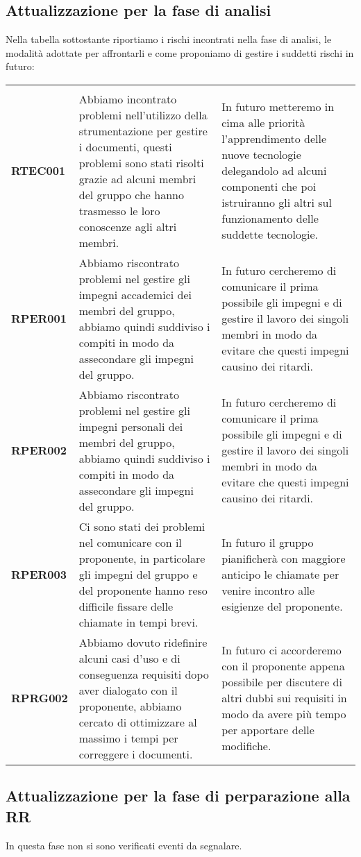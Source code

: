 \documentclass[../piano-di-progetto]{subfiles}
\begin{document}
\subsection{Attualizzazione per la fase di analisi}%
\label{sub:attualizzazione_fase_analisi}
Nella tabella sottostante riportiamo i rischi incontrati nella fase di analisi, le modalità adottate per affrontarli e come proponiamo di gestire i suddetti rischi in futuro:
\begin{table}[H]%
  \label{tab:registro_delle_modifiche}

  \centering

  \begin{longtable}[H]{|p{10em}|p{17em}|p{17em}|}
    \rowcolor{darkgray!90!}\color{white}{\textbf{Rischio}} & \color{white}{\textbf{Gestione}} & \color{white}{\textbf{Monitoraggio}} \\
    \textbf{RTEC001} & Abbiamo incontrato problemi nell'utilizzo della strumentazione per gestire i documenti, questi problemi sono stati risolti grazie ad alcuni membri del gruppo che hanno trasmesso le loro conoscenze agli altri membri. & In futuro metteremo in cima alle priorità l'apprendimento delle nuove tecnologie delegandolo ad alcuni componenti che poi istruiranno gli altri sul funzionamento delle suddette tecnologie.\\
    \textbf{RPER001} & Abbiamo riscontrato problemi nel gestire gli impegni accademici dei membri del gruppo, abbiamo quindi suddiviso i compiti in modo da assecondare gli impegni del gruppo. & In futuro cercheremo di comunicare il prima possibile gli impegni e di gestire il lavoro dei singoli membri in modo da evitare che questi impegni causino dei ritardi.\\
    \textbf{RPER002} & Abbiamo riscontrato problemi nel gestire gli impegni personali dei membri del gruppo, abbiamo quindi suddiviso i compiti in modo da assecondare gli impegni del gruppo. & In futuro cercheremo di comunicare il prima possibile gli impegni e di gestire il lavoro dei singoli membri in modo da evitare che questi impegni causino dei ritardi.\\
    \textbf{RPER003} & Ci sono stati dei problemi nel comunicare con il proponente, in particolare gli impegni del gruppo e del proponente hanno reso difficile fissare delle chiamate in tempi brevi. & In futuro il gruppo pianificherà con maggiore anticipo le chiamate per venire incontro alle esigienze del proponente.\\
    \textbf{RPRG002} & Abbiamo dovuto ridefinire alcuni casi d'uso e di conseguenza requisiti dopo aver dialogato con il proponente, abbiamo cercato di ottimizzare al massimo i tempi per correggere i documenti. & In futuro ci accorderemo con il proponente appena possibile per discutere di altri dubbi sui requisiti in modo da avere più tempo per apportare delle modifiche.\\
    \hline
  \end{longtable}
\end{table}
\subsection{Attualizzazione per la fase di perparazione alla RR}%
\label{sub:attualizzazione_fase_prep_RR}
In questa fase non si sono verificati eventi da segnalare.
\end{document}
